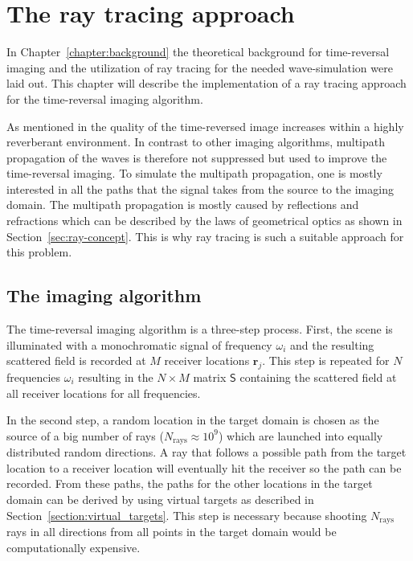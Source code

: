 
\chapter{The ray tracing approach}\label{chapter:the_raytracing_approach}
In Chapter~\ref{chapter:background} the theoretical background for time-reversal imaging and the utilization of ray tracing for the needed wave-simulation were laid out.
This chapter will describe the implementation of a ray tracing approach for the time-reversal imaging algorithm.

As mentioned in \parencite{dyab_critical_2013} the quality of the time-reversed image increases within a highly reverberant environment.
In contrast to other imaging algorithms, multipath propagation of the waves is therefore not suppressed but used to improve the time-reversal imaging.
To simulate the multipath propagation, one is mostly interested in all the paths that the signal takes from the source to the imaging domain.
The multipath propagation is mostly caused by reflections and refractions which can be described by the laws of geometrical optics as shown in Section~\ref{sec:ray-concept}.
This is why ray tracing is such a suitable approach for this problem.

\section{The imaging algorithm}
The time-reversal imaging algorithm is a three-step process.
First, the scene is illuminated with a monochromatic signal of frequency \(\omega_i\) and the resulting scattered field is recorded at \(M\) receiver locations \(\mathbf{r}_j\). 
This step is repeated for \(N\) frequencies \(\omega_i\) resulting in the \(N \times M\) matrix \(\mathsf{S} \) containing the scattered field at all receiver locations for all frequencies.

In the second step, a random location in the target domain is chosen as the source of a big number of rays (\(N_{\text{rays}}\approx 10^{9}\)) which are launched into equally distributed random directions.
A ray that follows a possible path from the target location to a receiver location will eventually hit the receiver so the path can be recorded.
From these paths, the paths for the other locations in the target domain can be derived by using virtual targets as described in Section~\ref{section:virtual_targets}.
This step is necessary because shooting \(N_{\text{rays}}\) rays in all directions from all points in the target domain would be computationally expensive.

